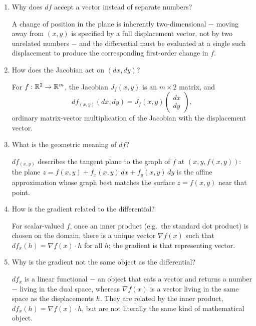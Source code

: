 \documentclass{self-check}
\begin{document}
\begin{enumerate}[resume, leftmargin=*, itemsep=8pt]
\item Why does \(df\) accept a vector instead of separate numbers?
\begin{answer}
A change of position in the plane is inherently two-dimensional \(-\) moving away from \((x,y)\) is specified by a full displacement vector, not by two unrelated numbers \(-\) and the differential must be evaluated at a single such displacement to produce the corresponding first-order change in \(f\).
\end{answer}

\item How does the Jacobian act on \((dx,dy)\)?
\begin{answer}
For \(f:\mathbb{R}^2\to\mathbb{R}^m\), the Jacobian \(J_f(x,y)\) is an \(m\times2\) matrix, and
\[
df_{(x,y)}(dx,dy) = J_f(x,y)\begin{pmatrix}dx\\dy\end{pmatrix},
\]
ordinary matrix-vector multiplication of the Jacobian with the displacement vector.
\end{answer}

\item What is the geometric meaning of \(df\)?
\begin{answer}
\(df_{(x,y)}\) describes the tangent plane to the graph of \(f\) at \((x,y,f(x,y))\): the plane \(z=f(x,y)+f_x(x,y)\,dx+f_y(x,y)\,dy\) is the affine approximation whose graph best matches the surface \(z=f(x,y)\) near that point.
\end{answer}

\item How is the gradient related to the differential?
\begin{answer}
For scalar-valued \(f\), once an inner product (e.g.\ the standard dot product) is chosen on the domain, there is a unique vector \(\nabla f(x)\) such that \(df_x(h)=\nabla f(x)\cdot h\) for all \(h\); the gradient is that representing vector.
\end{answer}

\item Why is the gradient not the same object as the differential?
\begin{answer}
\(df_x\) is a linear functional \(-\) an object that eats a vector and returns a number \(-\) living in the dual space, whereas \(\nabla f(x)\) is a vector living in the same space as the displacements \(h\). They are related by the inner product, \(df_x(h)=\nabla f(x)\cdot h\), but are not literally the same kind of mathematical object.
\end{answer}


\end{enumerate}
\end{document}
